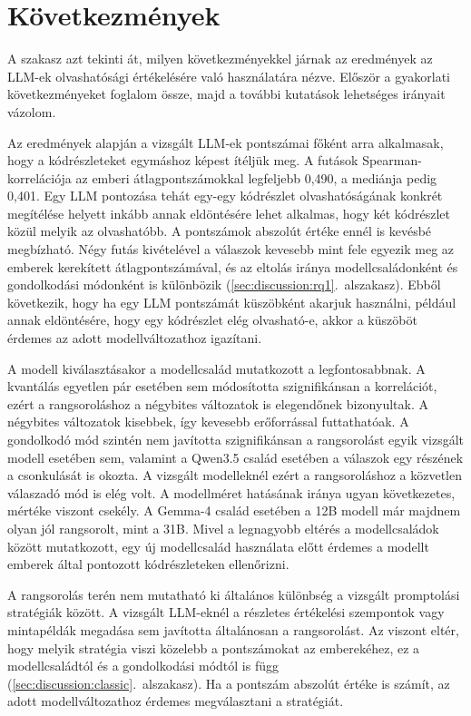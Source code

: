 \documentclass[
]{elteikthesis}[2024/04/26]
\begin{document}
\section{Következmények}
\label{sec:discussion:practice}

A szakasz azt tekinti át, milyen következményekkel járnak az eredmények
az LLM-ek olvashatósági értékelésére való használatára nézve.
Először a gyakorlati következményeket foglalom össze,
majd a további kutatások lehetséges irányait vázolom.

Az eredmények alapján a vizsgált LLM-ek pontszámai főként arra alkalmasak,
hogy a kódrészleteket egymáshoz képest ítéljük meg.
A futások Spearman-korrelációja az emberi átlagpontszámokkal legfeljebb 0,490, a mediánja pedig 0,401.
Egy LLM pontozása tehát egy-egy kódrészlet olvashatóságának konkrét megítélése helyett inkább annak eldöntésére lehet alkalmas,
hogy két kódrészlet közül melyik az olvashatóbb.
A pontszámok abszolút értéke ennél is kevésbé megbízható.
Négy futás kivételével a válaszok kevesebb mint fele egyezik meg az emberek kerekített átlagpontszámával,
és az eltolás iránya modellcsaládonként és gondolkodási módonként is különbözik (\ref{sec:discussion:rq1}.~alszakasz).
Ebből következik, hogy ha egy LLM pontszámát küszöbként akarjuk használni, például annak eldöntésére, hogy egy kódrészlet
elég olvasható-e, akkor a küszöböt érdemes az adott modellváltozathoz igazítani.

A modell kiválasztásakor a modellcsalád mutatkozott a legfontosabbnak.
A kvantálás egyetlen pár esetében sem módosította szignifikánsan a korrelációt,
ezért a rangsoroláshoz a négybites változatok is elegendőnek bizonyultak.
A négybites változatok kisebbek, így kevesebb erőforrással futtathatóak.
A gondolkodó mód szintén nem javította szignifikánsan a rangsorolást egyik vizsgált modell esetében sem,
valamint a Qwen3.5 család esetében a válaszok egy részének a csonkulását is okozta.
A vizsgált modelleknél ezért a rangsoroláshoz a közvetlen válaszadó mód is elég volt.
A modellméret hatásának iránya ugyan következetes, mértéke viszont csekély.
A Gemma-4 család esetében a 12B modell már majdnem olyan jól rangsorolt, mint a 31B.
Mivel a legnagyobb eltérés a modellcsaládok között mutatkozott,
egy új modellcsalád használata előtt érdemes a modellt emberek által
pontozott kódrészleteken ellenőrizni.

A rangsorolás terén nem mutatható ki általános különbség a vizsgált promptolási stratégiák között.
A vizsgált LLM-eknél a részletes értékelési szempontok vagy mintapéldák megadása sem javította általánosan a rangsorolást.
Az viszont eltér, hogy melyik stratégia viszi közelebb a pontszámokat az emberekéhez,
ez a modellcsaládtól és a gondolkodási módtól is függ (\ref{sec:discussion:classic}.~alszakasz).
Ha a pontszám abszolút értéke is számít, az adott modellváltozathoz érdemes megválasztani a stratégiát.
\end{document}
